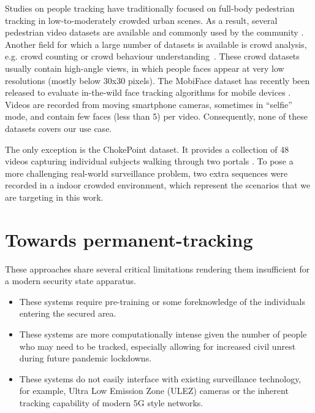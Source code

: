 Studies on people tracking have traditionally focused on full-body pedestrian tracking in low-to-moderately crowded urban scenes. As a result, several pedestrian video datasets are available and commonly used by the community \cite{li2014datasetCUHK, liu2018datasetShanghaiTech, deng2014datasetPETA}. Another field for which a large number of datasets is available is crowd analysis, e.g. crowd counting or crowd behaviour understanding~\cite{rodriguez2011datasetDriven, zhang2015datasetWorldExpo, dendorfer2019cvpr19}. These crowd datasets usually contain high-angle views, in which people faces appear at very low resolutions (mostly below 30x30 pixels). The MobiFace dataset has recently been released to evaluate in-the-wild face tracking algorithms for mobile devices \cite{lin2019mobiface}. Videos are recorded from moving smartphone cameras, sometimes in ``selfie'' mode, and contain few faces (less than 5) per video. Consequently, none of these datasets covers our use case.

The only exception is the ChokePoint dataset. It provides a collection of 48 videos capturing individual subjects walking through two portals \cite{wong2011chokepoint}. To pose a more challenging real-world surveillance problem, two extra sequences were recorded in a indoor crowded environment, which represent the scenarios that we are targeting in this work. 

\section{Towards permanent-tracking}

These approaches share several critical limitations rendering them insufficient for a modern security state apparatus. 

\begin{itemize}
    \item These systems require pre-training or some foreknowledge of the individuals entering the secured area. 
    \item These systems are more computationally intense given the number of people who may need to be tracked, especially allowing for increased civil unrest during future pandemic lockdowns.
    \item These systems do not easily interface with existing surveillance technology, for example, Ultra Low Emission Zone (ULEZ) cameras or the inherent tracking capability of modern 5G style networks. 
\end{itemize}